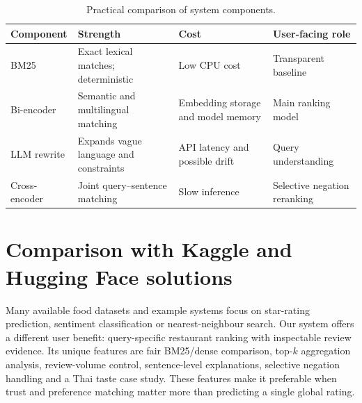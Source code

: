 \begin{table}[H]
\centering\small
\caption{Practical comparison of system components.}
\label{tab:complexity}
\begin{tabularx}{\textwidth}{@{}lLLL@{}}
\toprule
Component & Strength & Cost & User-facing role\\
\midrule
BM25 & Exact lexical matches; deterministic & Low CPU cost & Transparent baseline\\
Bi-encoder & Semantic and multilingual matching & Embedding storage and model memory & Main ranking model\\
LLM rewrite & Expands vague language and constraints & API latency and possible drift & Query understanding\\
Cross-encoder & Joint query--sentence matching & Slow inference & Selective negation reranking\\
\bottomrule
\end{tabularx}
\end{table}

\section{Comparison with Kaggle and Hugging Face solutions}
Many available food datasets and example systems focus on star-rating prediction, sentiment
classification or nearest-neighbour search. Our system offers a different user benefit:
query-specific restaurant ranking with inspectable review evidence. Its unique features are fair
BM25/dense comparison, top-$k$ aggregation analysis, review-volume control, sentence-level
explanations, selective negation handling and a Thai taste case study. These features make it
preferable when trust and preference matching matter more than predicting a single global rating.

